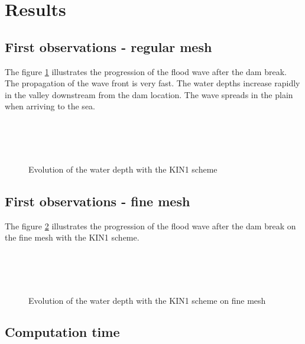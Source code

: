 \section{Results}
\subsection{First observations - regular mesh}

The figure \ref{fig:malpasset:WD_cin1} illustrates the progression of the flood wave after the dam break.
The propagation of the wave front is very fast. The water depths increase rapidly in the valley downstream from the dam location. The wave spreads in the plain when arriving to the sea.

\begin{figure}[H]
  \centering
  \\
  \\
  \\
  \caption{Evolution of the water depth with the KIN1 scheme}\label{fig:malpasset:WD_cin1}
\end{figure}

\subsection{First observations - fine mesh}

The figure \ref{fig:malpasset:WD_fine} illustrates the progression of the flood wave after the dam break on the fine mesh
with the KIN1 scheme.
\begin{figure}[H]
  \centering
  \\
  \\
  \\
  \caption{Evolution of the water depth with the KIN1 scheme on fine mesh}\label{fig:malpasset:WD_fine}
\end{figure}

\subsection{Computation time}

